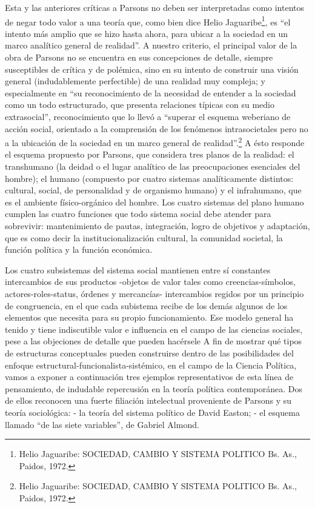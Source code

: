 \documentclass[
]{book}
\begin{document}
Esta y las anteriores críticas a Parsons no deben ser interpretadas como intentos de negar todo valor a una teoría que, como bien dice Helio Jaguaribe\footnote{Helio Jaguaribe: SOCIEDAD, CAMBIO Y SISTEMA POLITICO Bs. As., Paidos, 1972.}, es ``el intento más amplio que se hizo hasta ahora, para ubicar a la sociedad en un marco analítico general de realidad''. A nuestro criterio, el principal valor de la obra de Parsons no se encuentra en sus concepciones de detalle, siempre susceptibles de crítica y de polémica, sino en su intento de construir una visión general (indudablemente perfectible) de una realidad muy compleja; y especialmente en ``su reconocimiento de la necesidad de entender a la sociedad como un todo estructurado, que presenta relaciones típicas con su medio extrasocial'', reconocimiento que lo llevó a ``superar el esquema weberiano de acción social, orientado a la comprensión de los fenómenos intrasocietales pero no a la ubicación de la sociedad en un marco general de realidad''.\footnote{Helio Jaguaribe: SOCIEDAD, CAMBIO Y SISTEMA POLITICO Bs. As., Paidos, 1972.} A ésto responde el esquema propuesto por Parsons, que considera tres planos de la realidad: el transhumano (la deidad o el lugar analítico de las preocupaciones esenciales del hombre); el humano (compuesto por cuatro sistemas analíticamente distintos: cultural, social, de personalidad y de organismo humano) y el infrahumano, que es el ambiente físico-orgánico del hombre. Los cuatro sistemas del plano humano cumplen las cuatro funciones que todo sistema social debe atender para sobrevivir: mantenimiento de pautas, integración, logro de objetivos y adaptación, que es como decir la institucionalización cultural, la comunidad societal, la función política y la función económica.

Los cuatro subsistemas del sistema social mantienen entre sí constantes intercambios de sus productos -objetos de valor tales como creencias-símbolos, actores-roles-status, órdenes y mercancías- intercambios regidos por un principio de congruencia, en el que cada subistema recibe de los demás algunos de los elementos que necesita para su propio funcionamiento. Ese modelo general ha tenido y tiene indiscutible valor e influencia en el campo de las ciencias sociales, pese a las objeciones de detalle que pueden hacérsele A fin de mostrar qué tipos de estructuras conceptuales pueden construirse dentro de las posibilidades del enfoque estructural-funcionalista-sistémico, en el campo de la Ciencia Política, vamos a exponer a continuación tres ejemplos representativos de esta línea de pensamiento, de indudable repercusión en la teoría política contemporánea. Dos de ellos reconocen una fuerte filiación intelectual proveniente de Parsons y su teoría sociológica: - la teoría del sistema político de David Easton; - el esquema llamado ``de las siete variables'', de Gabriel Almond.
\end{document}
